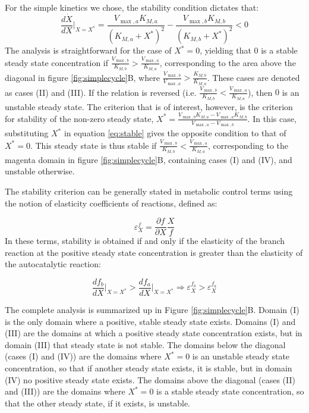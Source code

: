     For the simple kinetics we chose, the stability condition dictates that:
    \begin{equation}
        \label{eq:stable}
      \frac{d\dot X}{dX}\Big\vert_{X=X^*} = \frac{V_{\max,a}K_{M,a}}{(K_{M,a}+X^*)^2}-\frac{V_{\max,b}K_{M,b}}{(K_{M,b}+X^*)^2}<0
    \end{equation}
    The analysis is straightforward for the case of $X^*=0$, yielding that $0$ is a stable steady state concentration if $\frac{V_{\max,b}}{K_{M,b}}>\frac{V_{\max,a}}{K_{M,a}}$, corresponding to the area above the diagonal in figure \ref{fig:simplecycle}B, where $\frac{V_{\max,b}}{V_{\max,a}}>\frac{K_{M,b}}{K_{M,a}}$. These cases are denoted as cases (II) and (III).
    If the relation is reversed (i.e. $\frac{V_{\max,b}}{K_{M,b}}<\frac{V_{\max,a}}{K_{M,a}}$), then $0$ is an unstable steady state.
    The criterion that is of interest, however, is the criterion for stability of the non-zero steady state, $X^*=\frac{V_{\max,b}K_{M,a}-V_{\max,a}K_{M,b}}{V_{\max,a}-V_{\max,b}}$.
    In this case, substituting $X^*$ in equation \ref{eq:stable} gives the opposite condition to that of $X^*=0$.
    This steady state is thus stable if $\frac{V_{\max,b}}{K_{M,b}}<\frac{V_{\max,a}}{K_{M,a}}$, corresponding to the magenta domain in figure \ref{fig:simplecycle}B, containing cases (I) and (IV), and unstable otherwise.

    The stability criterion can be generally stated in metabolic control terms \cite{Fell1997-bp} using the notion of elasticity coefficients of reactions, defined as:

    \begin{equation*}
    \varepsilon^f_X=\frac{\partial f}{\partial X}\frac{X}{f}
    \end{equation*}
    In these terms, stability is obtained if and only if the elasticity of the branch reaction at the positive steady state concentration is greater than the elasticity of the autocatalytic reaction:

    \begin{equation*}
        \frac{df_b}{dX}\Big\vert_{X=X^*}>\frac{df_a}{dX}\Big\vert_{X=X^*} \Rightarrow \varepsilon^{f_b}_X>\varepsilon^{f_a}_X
    \end{equation*}

    The complete analysis is summarized up in Figure \ref{fig:simplecycle}B.
    Domain (I) is the only domain where a positive, stable steady state exists.
    Domains (I) and (III) are the domains at which a positive steady state concentration exists, but in domain (III) that steady state is not stable.
    The domains below the diagonal (cases (I) and (IV)) are the domains where $X^*=0$ is an unstable steady state concentration, so that if another steady state exists, it is stable, but in domain (IV) no positive steady state exists.
    The domains above the diagonal (cases (II) and (III)) are the domains where $X^*=0$ is a stable steady state concentration, so that the other steady state, if it exists, is unstable.

